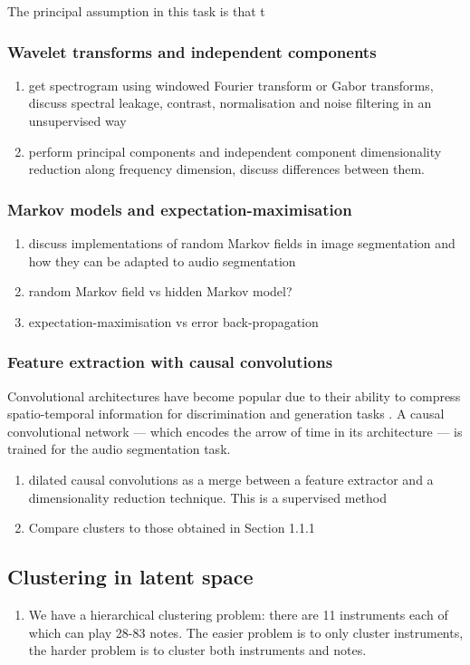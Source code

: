 \documentclass{article}[12pt]
\numberwithin{equation}{section}
\begin{document}
The principal assumption in this task is that t 

\subsubsection{Wavelet transforms and independent components}
\begin{enumerate}
	\item get spectrogram using windowed Fourier transform or Gabor transforms,
	discuss spectral leakage, contrast, normalisation and noise filtering in an
	unsupervised way
	\item perform principal components and independent component dimensionality
	reduction along frequency dimension, discuss differences between them.
\end{enumerate}
\subsubsection{Markov models and expectation-maximisation}
\begin{enumerate}
	\item discuss implementations of random Markov fields in image segmentation
	and how they can be adapted to audio segmentation
	\item random Markov field vs hidden Markov model?
	\item expectation-maximisation vs error back-propagation
\end{enumerate}
\subsubsection{Feature extraction with causal convolutions}
Convolutional architectures have become popular due to their ability to compress spatio-temporal
information for discrimination and generation tasks \cite{Oord2016a,Goodfellow}.
A causal convolutional network \cite{Oord2016} --- which encodes the arrow of time in
its architecture --- is trained for the audio segmentation task.
\begin{enumerate}
	\item dilated causal convolutions as a merge between a feature
	extractor and a dimensionality reduction technique. This is a supervised method
	\item Compare clusters to those obtained in Section 1.1.1
\end{enumerate}
\subsection{Clustering in latent space}
\begin{enumerate}
	\item We have a hierarchical clustering problem: there are 11 instruments each
	of which can play 28-83 notes. The easier problem is to only cluster instruments,
	the harder problem is to cluster both instruments and notes.
\end{enumerate}
\end{document}
